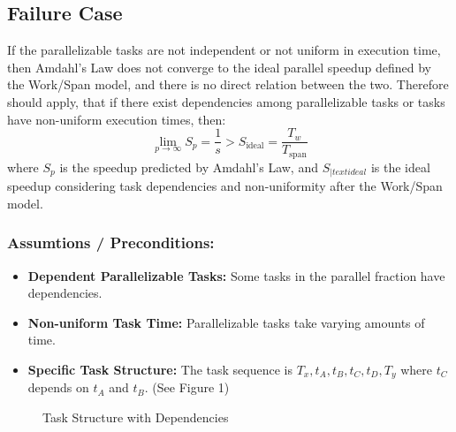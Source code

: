 \documentclass[
  a4paper, %
]{kaohandt}
\begin{document}
\subsection{Failure Case}

\begin{theorem}
  If the parallelizable tasks are not independent or not uniform in execution time, then Amdahl's Law does not converge to the ideal parallel speedup defined by the Work/Span model, and there is no direct relation between the two.
  Therefore should apply, that if there exist dependencies among parallelizable tasks or tasks have non-uniform execution times, then:
  \begin{equation}
    \lim_{p \to \infty} S_p = \frac{1}{s} > S_{\text{ideal}} = \frac{T_w}{T_{\text{span}}}
  \end{equation}
  where $S_p$ is the speedup predicted by Amdahl's Law, and $S_{|text{ideal}}$ is the ideal speedup considering task dependencies and non-uniformity after the Work/Span model.
\end{theorem}

\subsubsection*{Assumtions / Preconditions:}

\begin{itemize}
  \item \textbf{Dependent Parallelizable Tasks:} Some tasks in the parallel fraction have dependencies.
  \item \textbf{Non-uniform Task Time:} Parallelizable tasks take varying amounts of time.
  \item \textbf{Specific Task Structure:} The task sequence is $T_x, t_A, t_B, t_C, t_D, T_y$ where $t_C$ depends on $t_A$ and $t_B$. (See Figure 1)
\end{itemize}

\begin{figure*}[h!]
  \caption{Task Structure with Dependencies}
  \centering
\end{figure*}
\end{document}
